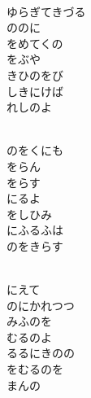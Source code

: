 \documentclass[10pt,b5j]{tarticle} %
\begin{document}
\begin{enumerate}
\begin{minipage}[c]{\blocksize}
        \vspace{\linespace}
        \item~\\
        ゆらぎてきづる\\
        ののに\\
        をめてくの\\
        をぶや\\
        きひのをび\\
        しきにけば\\
        れしのよ
        
        \vspace{\linespace}
        \item~\\
        のをくにも\\
        をらん\\
        をらす\\
        にるよ\\
        をしひみ\\
        にふるふは\\
        のをきらす
        
        \vspace{\linespace}
        \item~\\
        にえて\\
        のにかれつつ\\
        みふのを\\
        むるのよ\\
        るるにきのの\\
        をむるのを\\
        まんの
        

\end{minipage}
\end{enumerate}
\end{document}
